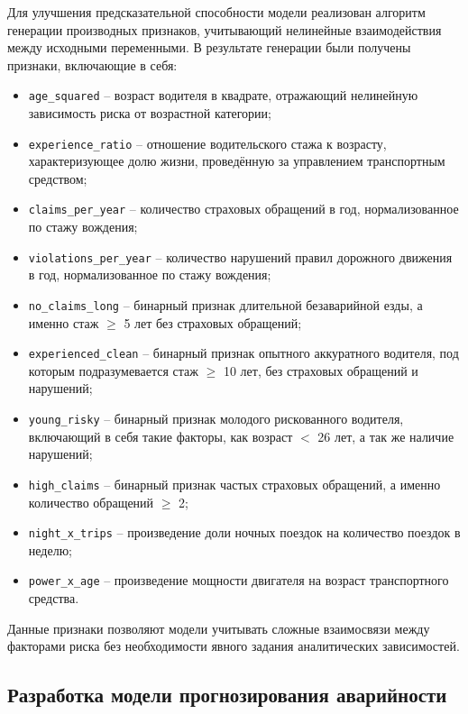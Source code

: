 Для улучшения предсказательной способности модели реализован алгоритм генерации производных признаков, учитывающий нелинейные взаимодействия между исходными переменными. В результате генерации были получены признаки, включающие в себя:

\begin{itemize}
    \item \texttt{age\_squared} – возраст водителя в квадрате, отражающий нелинейную зависимость риска от возрастной категории;
    \item \texttt{experience\_ratio} – отношение водительского стажа к возрасту, характеризующее долю жизни, проведённую за управлением транспортным средством;
    \item \texttt{claims\_per\_year} – количество страховых обращений в год, нормализованное по стажу вождения;
    \item \texttt{violations\_per\_year} – количество нарушений правил дорожного движения в год, нормализованное по стажу вождения;
    \item \texttt{no\_claims\_long} – бинарный признак длительной безаварийной езды, а именно стаж $\geq$ 5 лет без страховых обращений;
    \item \texttt{experienced\_clean} – бинарный признак опытного аккуратного водителя, под которым подразумевается стаж $\geq$ 10 лет, без страховых обращений и нарушений;
    \item \texttt{young\_risky} – бинарный признак молодого рискованного водителя, включающий в себя такие факторы, как возраст $<$ 26 лет, а так же наличие нарушений;
    \item \texttt{high\_claims} – бинарный признак частых страховых обращений, а именно количество обращений $\geq$ 2;
    \item \texttt{night\_x\_trips} – произведение доли ночных поездок на количество поездок в неделю;
    \item \texttt{power\_x\_age} – произведение мощности двигателя на возраст транспортного средства.
\end{itemize}

Данные признаки позволяют модели учитывать сложные взаимосвязи между факторами риска без необходимости явного задания аналитических зависимостей.


\subsection{Разработка модели прогнозирования аварийности}

